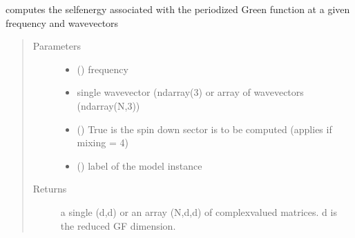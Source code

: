 \documentclass[letterpaper,10pt,english]{sphinxmanual}
\begin{document}
\begin{fulllineitems}
\label{\detokenize{functions:pyqcm.self_energy}}
\sphinxAtStartPar
computes the self\sphinxhyphen{}energy associated with the periodized Green function at a given frequency and wavevectors
\begin{quote}\begin{description}
\item[{Parameters}] \leavevmode\begin{itemize}
\item {} 
\sphinxAtStartPar
{} () \textendash{} frequency

\item {} 
\sphinxAtStartPar
{} \textendash{} single wavevector (ndarray(3) or array of wavevectors (ndarray(N,3))

\item {} 
\sphinxAtStartPar
{} () \textendash{} True is the spin down sector is to be computed (applies if mixing = 4)

\item {} 
\sphinxAtStartPar
{} () \textendash{} label of the model instance

\end{itemize}

\item[{Returns}] \leavevmode
\sphinxAtStartPar
a single (d,d) or an array (N,d,d) of complex\sphinxhyphen{}valued matrices. d is the reduced GF dimension.

\end{description}\end{quote}

\end{fulllineitems}

\end{document}
